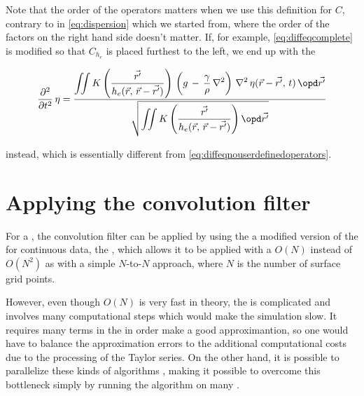 Note that the order of the operators matters when we use this definition for $C$, contrary to in \eqref{eq:dispersion} which we started from, where the order of the factors on the right hand side doesn't matter. If, for example, \eqref{eq:diffeqcomplete} is modified so that $C_{h_e}$ is placed furthest to the left, we end up with the \PDE

\begin{equation} \label{eq:diffeqnouserdefinedoperatorsvariant}
\frac{\partial^2}{\partial t^2}\,\eta = \frac{\displaystyle\iint K\left(\frac{\vec{r'}}{h_e(\vec{r},\,\vec{r}-\vec{r'})}\right)\,\left(g\,-\,\frac{\gamma}{\rho}\,\nabla^2\right)\,\nabla^2\,\eta(\vec{r}-\vec{r'},\,t)\,\opd\vec{r'}}{\sqrt{\displaystyle\iint K\left(\frac{\vec{r'}}{h_e(\vec{r},\,\vec{r}-\vec{r'})}\right) \opd\vec{r'}}}
\end{equation}

instead, which is essentially different from \eqref{eq:diffeqnouserdefinedoperators}.

\section{Applying the convolution filter}

For a , the convolution filter can be applied by using the a modified version of the \FMM{} \citep{Greengard1985,Greengard1987a} for continuous data, the \CFMM{} \citep{White1994}, which allows it to be applied with a $O(N)$  instead of $O(N^2)$ as with a simple $N$-to-$N$ approach, where $N$ is the number of surface grid points.

However, even though $O(N)$ is very fast in theory, the \CFMM is complicated and involves many computational steps which would make the simulation slow. It requires many terms in the  in order make a good approximantion, so one would have to balance the approximation errors to the additional computational costs due to the processing of the Taylor series. On the other hand, it is possible to parallelize these kinds of algorithms \citep[see e.g.][]{Board1994}, making it possible to overcome this bottleneck simply by running the algorithm on many .
